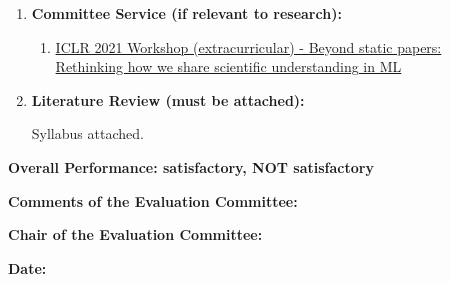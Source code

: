 \documentclass[11pt]{article}
\begin{document}
\begin{enumerate}
        \item \textbf{Committee Service (if relevant to research):}

        \begin{enumerate}
            \item \href{https://newpapers.github.io/}{ICLR 2021 Workshop (extracurricular) - Beyond static papers: Rethinking how we share scientific understanding in ML}
        \end{enumerate}

        \item \textbf{Literature Review  (must be attached):}

        Syllabus attached.

    \end{enumerate}

    \bigskip

    \newpage
    \textbf{Overall Performance: \qquad satisfactory\underline{\hspace{20mm}},
    \qquad NOT satisfactory\underline{\hspace{20mm}}}

    \bigskip
    \textbf{Comments of the Evaluation Committee:}

    \bigskip

    \vspace{100mm}


    \textbf{Chair of the  Evaluation Committee:}
    \bigskip

    \textbf{Date:} %
\end{document}
